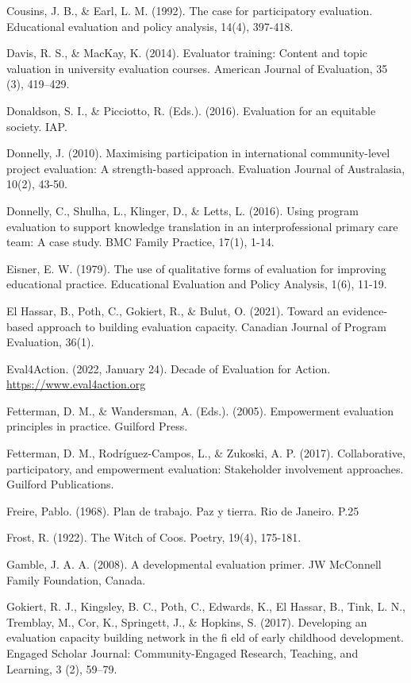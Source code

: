 \documentclass[
]{book}
\begin{document}
Cousins, J. B., \& Earl, L. M. (1992). The case for participatory evaluation. Educational evaluation and policy analysis, 14(4), 397-418.

Davis, R. S., \& MacKay, K. (2014). Evaluator training: Content and topic valuation in university evaluation courses. American Journal of Evaluation, 35 (3), 419--429.

Donaldson, S. I., \& Picciotto, R. (Eds.). (2016). Evaluation for an equitable society. IAP.

Donnelly, J. (2010). Maximising participation in international community-level project evaluation: A strength-based approach. Evaluation Journal of Australasia, 10(2), 43-50.

Donnelly, C., Shulha, L., Klinger, D., \& Letts, L. (2016). Using program evaluation to support knowledge translation in an interprofessional primary care team: A case study. BMC Family Practice, 17(1), 1-14.

Eisner, E. W. (1979). The use of qualitative forms of evaluation for improving educational practice. Educational Evaluation and Policy Analysis, 1(6), 11-19.

El Hassar, B., Poth, C., Gokiert, R., \& Bulut, O. (2021). Toward an evidence-based approach to building evaluation capacity. Canadian Journal of Program Evaluation, 36(1).

Eval4Action. (2022, January 24). Decade of Evaluation for Action. \url{https://www.eval4action.org}

Fetterman, D. M., \& Wandersman, A. (Eds.). (2005). Empowerment evaluation principles in practice. Guilford Press.

Fetterman, D. M., Rodríguez-Campos, L., \& Zukoski, A. P. (2017). Collaborative, participatory, and empowerment evaluation: Stakeholder involvement approaches. Guilford Publications.

Freire, Pablo. (1968). Plan de trabajo. Paz y tierra. Rio de Janeiro. P.25

Frost, R. (1922). The Witch of Coos. Poetry, 19(4), 175-181.

Gamble, J. A. A. (2008). A developmental evaluation primer. JW McConnell Family Foundation, Canada.

Gokiert, R. J., Kingsley, B. C., Poth, C., Edwards, K., El Hassar, B., Tink, L. N., Tremblay, M., Cor, K., Springett, J., \& Hopkins, S. (2017). Developing an evaluation capacity building network in the fi eld of early childhood development. Engaged Scholar Journal: Community-Engaged Research, Teaching, and Learning, 3 (2), 59--79.
\end{document}
